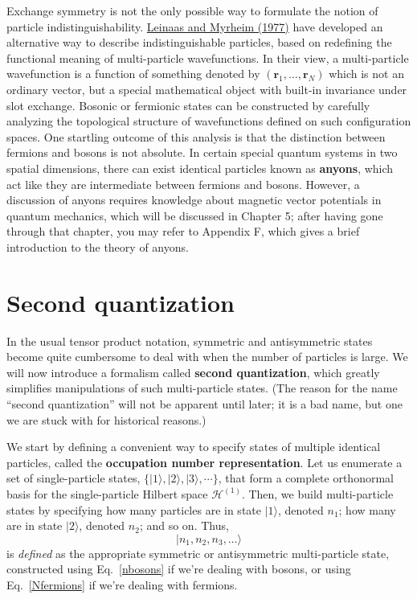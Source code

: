 \documentclass[prx,12pt]{revtex4-2}
\begin{document}
Exchange symmetry is not the only possible way to formulate the notion
of particle indistinguishability.  \hyperref[cite:leinaas]{Leinaas and
  Myrheim (1977)} have developed an alternative way to describe
indistinguishable particles, based on redefining the functional
meaning of multi-particle wavefunctions.  In their view, a
multi-particle wavefunction is a function of something denoted by
$(\mathbf{r}_1, \dots, \mathbf{r}_N)$ which is not an ordinary vector,
but a special mathematical object with built-in invariance under slot
exchange.  Bosonic or fermionic states can be constructed by carefully
analyzing the topological structure of wavefunctions defined on such
configuration spaces.  One startling outcome of this analysis is that
the distinction between fermions and bosons is not absolute.  In
certain special quantum systems in two spatial dimensions, there can
exist identical particles known as \textbf{anyons}, which act like
they are intermediate between fermions and bosons.  However, a
discussion of anyons requires knowledge about magnetic vector
potentials in quantum mechanics, which will be discussed in Chapter 5;
after having gone through that chapter, you may refer to Appendix F,
which gives a brief introduction to the theory of anyons.

\section{Second quantization}

In the usual tensor product notation, symmetric and antisymmetric
states become quite cumbersome to deal with when the number of
particles is large.  We will now introduce a formalism called
\textbf{second quantization}, which greatly simplifies manipulations
of such multi-particle states.  (The reason for the name ``second
quantization'' will not be apparent until later; it is a bad name, but
one we are stuck with for historical reasons.)

We start by defining a convenient way to specify states of multiple
identical particles, called the \textbf{occupation number
  representation}.  Let us enumerate a set of single-particle states,
$\{|1\rangle, |2\rangle, |3\rangle, \cdots\}$, that form a complete
orthonormal basis for the single-particle Hilbert space
$\mathscr{H}^{(1)}$.  Then, we build multi-particle states by
specifying how many particles are in state $|1\rangle$, denoted $n_1$;
how many are in state $|2\rangle$, denoted $n_2$; and so on.  Thus,
\begin{equation*}
  |n_1,n_2,n_3,\dots\rangle
\end{equation*}
is \textit{defined} as the appropriate symmetric or antisymmetric
multi-particle state, constructed using Eq.~\eqref{nbosons} if we're
dealing with bosons, or using Eq.~\eqref{Nfermions} if we're dealing
with fermions.
\end{document}
